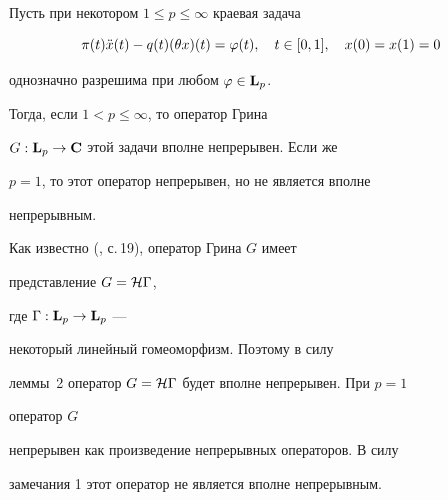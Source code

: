 \begin{lem}


Пусть при некотором $1\le p\le\infty$ краевая задача


$$


\pi (t)\Ddot{x}(t)-q(t)(\theta x)(t)=\varphi(t),\quad


t\in[0,1],\quad x(0)=x(1)=0


$$


однозначно разрешима при любом $\varphi\in\bold L_p$.


Тогда, если $1<p\le\infty$, то оператор Грина


$G:\bold L_p\to\bold C$ этой задачи вполне непрерывен. Если же


$p=1$, то этот оператор непрерывен, но не является вполне


непрерывным.


\end{lem}





\begin{pf} Как известно (\cite{3}, с.\,19), оператор Грина $G$ имеет


представление $G={\cal H}\Gamma$,


где $\Gamma:\bold L_p\to\bold L_p$ ---


некоторый линейный гомеоморфизм. Поэтому в силу


леммы~2 оператор $G={\cal H}\Gamma$ будет вполне непрерывен. При $p=1$


оператор $G$


непрерывен как произведение непрерывных операторов. В силу


замечания 1 этот оператор не является вполне непрерывным.


\end{pf}





